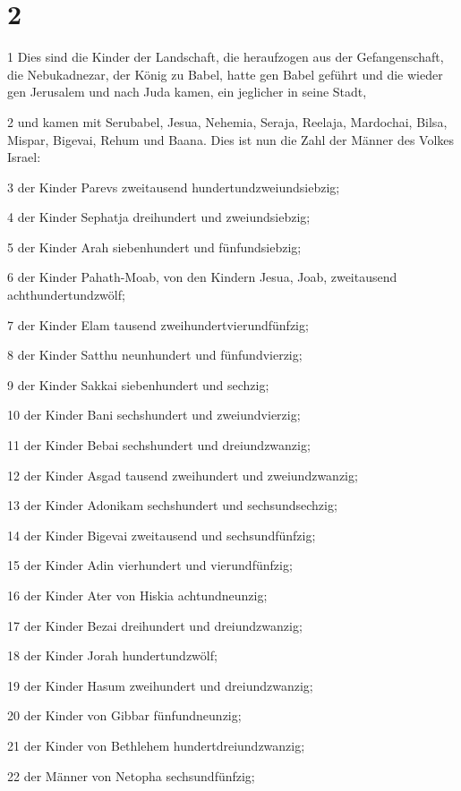 \chapter{2}

\par 1 Dies sind die Kinder der Landschaft, die heraufzogen aus der Gefangenschaft, die Nebukadnezar, der König zu Babel, hatte gen Babel geführt und die wieder gen Jerusalem und nach Juda kamen, ein jeglicher in seine Stadt,
\par 2 und kamen mit Serubabel, Jesua, Nehemia, Seraja, Reelaja, Mardochai, Bilsa, Mispar, Bigevai, Rehum und Baana. Dies ist nun die Zahl der Männer des Volkes Israel:
\par 3 der Kinder Parevs zweitausend hundertundzweiundsiebzig;
\par 4 der Kinder Sephatja dreihundert und zweiundsiebzig;
\par 5 der Kinder Arah siebenhundert und fünfundsiebzig;
\par 6 der Kinder Pahath-Moab, von den Kindern Jesua, Joab, zweitausend achthundertundzwölf;
\par 7 der Kinder Elam tausend zweihundertvierundfünfzig;
\par 8 der Kinder Satthu neunhundert und fünfundvierzig;
\par 9 der Kinder Sakkai siebenhundert und sechzig;
\par 10 der Kinder Bani sechshundert und zweiundvierzig;
\par 11 der Kinder Bebai sechshundert und dreiundzwanzig;
\par 12 der Kinder Asgad tausend zweihundert und zweiundzwanzig;
\par 13 der Kinder Adonikam sechshundert und sechsundsechzig;
\par 14 der Kinder Bigevai zweitausend und sechsundfünfzig;
\par 15 der Kinder Adin vierhundert und vierundfünfzig;
\par 16 der Kinder Ater von Hiskia achtundneunzig;
\par 17 der Kinder Bezai dreihundert und dreiundzwanzig;
\par 18 der Kinder Jorah hundertundzwölf;
\par 19 der Kinder Hasum zweihundert und dreiundzwanzig;
\par 20 der Kinder von Gibbar fünfundneunzig;
\par 21 der Kinder von Bethlehem hundertdreiundzwanzig;
\par 22 der Männer von Netopha sechsundfünfzig;

